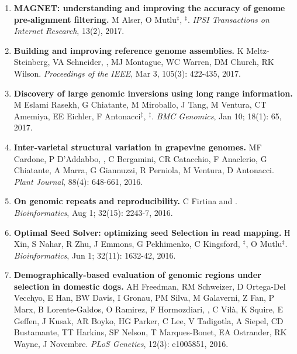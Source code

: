 \begin{enumerate}
  \item
                                       
         {\bf MAGNET: understanding and improving the accuracy of genome pre-alignment filtering.}
         M Alser, O Mutlu$^\ddag$, \calkan{}$^\ddag$. 
         {\em IPSI Transactions on Internet Research}, 13(2), 2017.



         
  \item        
         {\bf Building and improving reference genome assemblies.} K Meltz-Steinberg, VA Schneider, \calkan{}, MJ Montague, WC Warren, DM Church, RK Wilson.
         {\em Proceedings of the IEEE}, Mar 3, 105(3): 422-435, 2017.


  \item        
         {\bf Discovery of large genomic inversions using long
range information.} M Eslami Rasekh, G Chiatante, M Miroballo, J Tang, M Ventura, CT Amemiya, EE Eichler, F Antonacci$^\ddag$, \calkan{}$^\ddag$.
         {\em BMC Genomics}, Jan 10;  18(1): 65, 2017.

  \item        
  {\bf Inter-varietal structural variation in grapevine genomes.}
 MF Cardone, P D'Addabbo, \calkan{}, C Bergamini, CR Catacchio, F Anaclerio, G Chiatante, A Marra, G Giannuzzi, R Perniola, M Ventura, D Antonacci.
 {\em Plant Journal}, 88(4): 648-661, 2016.

  \item        
  {\bf On genomic repeats and reproducibility.}
  C Firtina and \calkan{}.
 {\em Bioinformatics}, Aug 1;   32(15): 2243-7, 2016.

  \item        
  {\bf Optimal Seed Solver: optimizing seed Selection in read mapping.}
  H Xin, S Nahar, R Zhu, J Emmons, G Pekhimenko, C Kingsford, \calkan{}$^\ddag$, O Mutlu$^\ddag$.
 {\em Bioinformatics}, Jun 1;  32(11): 1632-42, 2016.

  \item        
  {\bf Demographically-based evaluation of genomic regions under selection in domestic dogs.}
AH Freedman, RM Schweizer, D Ortega-Del Vecchyo, E Han, BW Davis, I Gronau, PM Silva, M Galaverni, Z Fan, P Marx, B Lorente-Galdos, O Ramirez, F Hormozdiari, \calkan{}, C Vilà, K Squire, 
E Geffen, J Kusak, AR Boyko, HG Parker, C Lee, V Tadigotla, A Siepel, CD Bustamante, TT Harkins, SF Nelson, T Marques-Bonet, EA Ostrander, RK Wayne, J Novembre.
 {\em PLoS Genetics}, 12(3): e1005851, 2016.


\end{enumerate}

